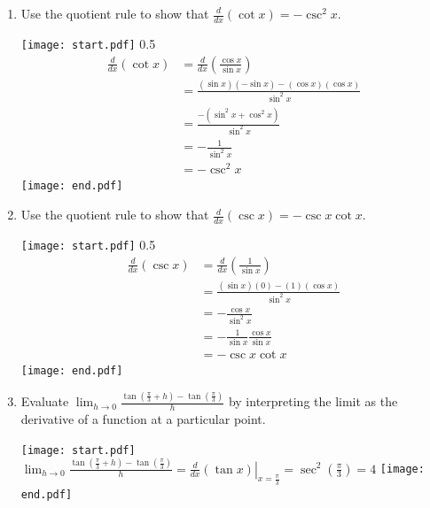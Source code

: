 \documentclass[12pt]{article}
\begin{document}
\begin{enumerate}
\item Use the quotient rule to show that $\frac{d}{dx}(\cot{x})=-\csc^2{x}$.

\texttt{[image: start.pdf]}
{{{0.5\linewidth}{
\begin{align*}
\frac{d}{dx}(\cot{x})&=\frac{d}{dx}\left(\frac{\cos{x}}{\sin{x}}\right)\\
&=\frac{(\sin{x})(-\sin{x})-(\cos{x})(\cos{x})}{\sin^2{x}}\\
&=\frac{-(\sin^2{x}+\cos^2{x})}{\sin^2{x}}\\
&=-\frac{1}{\sin^2{x}}\\
&=-\csc^2{x}
\end{align*}
}}}
\texttt{[image: end.pdf]}


\item Use the quotient rule to show that $\frac{d}{dx}(\csc{x})=-\csc{x}\cot{x}$.

\texttt{[image: start.pdf]}
{{{0.5\linewidth}{
\begin{align*}
\frac{d}{dx}(\csc{x})&=\frac{d}{dx}\left(\frac{1}{\sin{x}}\right)\\
&=\frac{(\sin{x})(0)-(1)(\cos{x})}{\sin^2{x}}\\
&=-\frac{\cos{x}}{\sin^2{x}}\\
&=-\frac{1}{\sin{x}}\frac{\cos{x}}{\sin{x}}\\
&=-\csc{x}\cot{x}
\end{align*}
}}}
\texttt{[image: end.pdf]}


\item Evaluate $\lim_{h \rightarrow 0}{\frac{\tan{\left(\frac{\pi}{3}+h\right)}-\tan{\left(\frac{\pi}{3}\right)}}{h}}$ by interpreting the limit as the derivative of a function at a particular point.

\texttt{[image: start.pdf]}
{{$\lim_{h \rightarrow 0}{\frac{\tan{\left(\frac{\pi}{3}+h\right)}-\tan{\left(\frac{\pi}{3}\right)}}{h}}=\left.\frac{d}{dx}(\tan{x})\right|_{x=\frac{\pi}{3}}=\sec^2{\left(\frac{\pi}{3}\right)}=4$}}
\texttt{[image: end.pdf]}


\end{enumerate}

\end{document}
